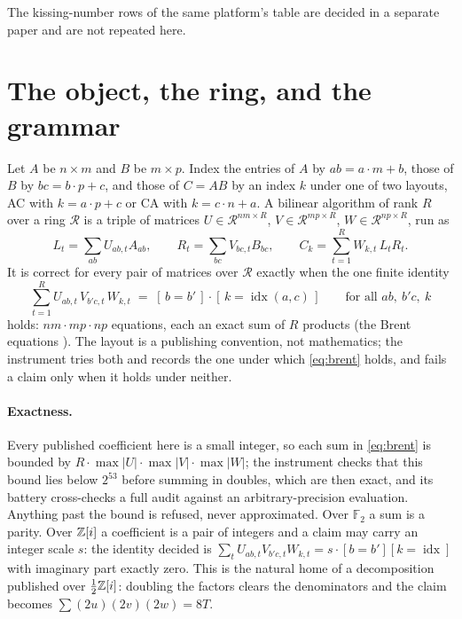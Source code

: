 \documentclass[11pt]{article}
\newcommand{\F}{\mathbb{F}}
\begin{document}
The kissing-number rows of the same platform's table are decided in a separate paper \cite{Kiss} and are
not repeated here.

\section{The object, the ring, and the grammar}\label{sec:object}

Let $A$ be $n\times m$ and $B$ be $m\times p$. Index the entries of $A$ by $ab = a\cdot m+b$, those of $B$
by $bc = b\cdot p+c$, and those of $C=AB$ by an index $k$ under one of two layouts, AC with
$k = a\cdot p + c$ or CA with $k = c\cdot n + a$. A bilinear algorithm of rank $R$ over a ring $\mathcal R$
is a triple of matrices $U\in\mathcal R^{nm\times R}$, $V\in\mathcal R^{mp\times R}$,
$W\in\mathcal R^{np\times R}$, run as
\[
L_t=\sum_{ab}U_{ab,t}A_{ab},\qquad R_t=\sum_{bc}V_{bc,t}B_{bc},\qquad C_k=\sum_{t=1}^{R}W_{k,t}\,L_tR_t .
\]
It is correct for every pair of matrices over $\mathcal R$ exactly when the one finite identity
\begin{equation}\label{eq:brent}
\sum_{t=1}^{R}U_{ab,t}\,V_{b'c,t}\,W_{k,t}\;=\;[\,b=b'\,]\cdot[\,k=\operatorname{idx}(a,c)\,]
\qquad\text{for all } ab,\ b'c,\ k
\end{equation}
holds: $nm\cdot mp\cdot np$ equations, each an exact sum of $R$ products (the Brent equations
\cite{Br70}). The layout is a publishing convention, not mathematics; the instrument tries both and records
the one under which \eqref{eq:brent} holds, and fails a claim only when it holds under neither.

\paragraph{Exactness.} Every published coefficient here is a small integer, so each sum in
\eqref{eq:brent} is bounded by $R\cdot\max|U|\cdot\max|V|\cdot\max|W|$; the instrument checks that this bound
lies below $2^{53}$ before summing in doubles, which are then exact, and its battery cross-checks a full audit
against an arbitrary-precision evaluation. Anything past the bound is refused, never approximated. Over
$\F_2$ a sum is a parity. Over $\mathbb{Z}[i]$ a coefficient is a pair of integers and a claim may carry an integer
scale $s$: the identity decided is $\sum_t U_{ab,t}V_{b'c,t}W_{k,t} = s\cdot[b=b'][k=\operatorname{idx}]$
with imaginary part exactly zero. This is the natural home of a decomposition published over
$\tfrac12\mathbb{Z}[i]$: doubling the factors clears the denominators and the claim becomes $\sum(2u)(2v)(2w)=8T$.
\end{document}
